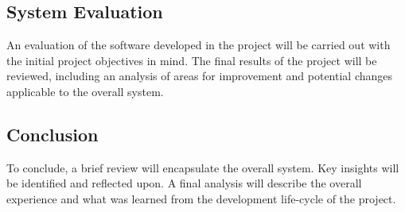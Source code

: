 \subsection{System Evaluation}
An evaluation of the software developed in the project will be carried out with the initial project objectives in mind. The final results of the project will be reviewed, including an analysis of areas for improvement and potential changes applicable to the overall system.
\subsection{Conclusion}
To conclude, a brief review will encapsulate the overall system. Key insights will be identified and reflected upon. A final analysis will describe the overall experience and what was learned from the development life-cycle of the project.